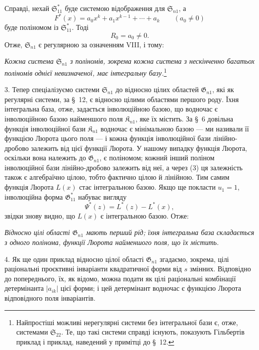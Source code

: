 \documentclass[11pt]{article}
\providecommand{\Kfield}{\mathfrak{K}}
\providecommand{\Ssys}{\mathfrak{S}}
\providecommand{\Gdom}{\mathfrak{G}}
\begin{document}
Справді, нехай $\Ssys^*_{11}$ буде системою відображення для $\Ssys_{n1}$, а
\[
  F^*(x)=a_0x^k+a_1x^{k-1}+\cdots+a_k\qquad(a_0\ne0)
\]
буде поліномом із $\Ssys^*_{11}$. Тоді
\begin{equation}
  R_0=a_0\ne0.
\tag{3}
\end{equation}
Отже, $\Ssys_{n1}$ є регулярною за означенням VIII, і тому:

\emph{Кожна система $\Ssys_{n1}$ з поліномів, зокрема кожна система з нескінченно багатьох поліномів однієї невизначеної, має інтегральну базу.}\footnote{Найпростіші можливі нерегулярні системи без інтегральної бази є, отже, системами $\Ssys_{22}$. Те, що такі системи справді існують, показують Гільбертів приклад і приклад, наведений у примітці до \S\ 12.}

3. Тепер спеціалізуємо системи $\Ssys_{n1}$ до відносно цілих областей $\Gdom_{n1}$, які як регулярні системи, за \S\ 12, є відносно цілими областями першого роду. Їхня інтегральна база, отже, задається інволюційною базою, що водночас є інволюційною базою найменшого поля $\Kfield_{n1}$, яке їх містить. За \S\ 6 довільна функція інволюційної бази $\Kfield_{n1}$ водночас є мінімальною базою --- ми називали її функцією Люрота цього поля --- і кожна функція інволюційної бази лінійно-дробово залежить від цієї функції Люрота. У нашому випадку функція Люрота, оскільки вона належить до $\Gdom_{n1}$, є поліномом; кожний інший поліном інволюційної бази лінійно-дробово залежить від неї, а через (3) ця залежність також є алгебраїчно цілою, тобто фактично цілою й лінійною. Тим самим функція Люрота $L(x)$ стає інтегральною базою. Якщо ще покласти $u_1=1$, інволюційна форма $\Gdom^*_{11}$ набуває вигляду
\[
  \Psi^*(z)=L^*(z)-L^*(x),
\]
звідки знову видно, що $L(x)$ є інтегральною базою. Отже:

\emph{Відносно цілі області $\Gdom_{n1}$ мають перший рід; їхня інтегральна база складається з одного полінома, функції Люрота найменшого поля, що їх містить.}

4. Як ще один приклад відносно цілої області $\Gdom_{n1}$ згадаємо, зокрема, цілі раціональні проєктивні інваріанти квадратичної форми від $s$ змінних. Відповідно до попереднього, їх, як відомо, можна подати як цілі раціональні комбінації детермінанта $|a_{ik}|$ цієї форми; і цей детермінант водночас є функцією Люрота відповідного поля інваріантів.
\end{document}
